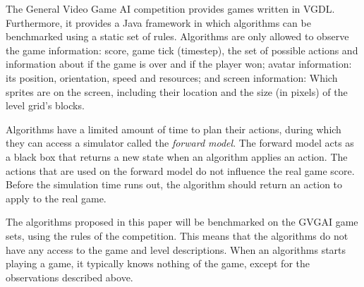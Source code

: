 The General Video Game AI competition provides games written in VGDL.
Furthermore, it provides a Java framework in which algorithms can be
benchmarked using a static set of rules. Algorithms are only allowed to observe
the game information: score, game tick (timestep), the set of possible actions
and information about if the game is over and if the player won; avatar
information: its position, orientation, speed and resources; and screen
information: Which sprites are on the screen, including their location and the
size (in pixels) of the level grid's blocks.

Algorithms have a limited amount of time to plan their actions, during which
they can access a simulator called the \emph{forward model}. The forward model
acts as a black box that returns a new state when an algorithm applies an
action. The actions that are used on the forward model do not influence the real
game score. Before the simulation time runs out, the algorithm should return an
action to apply to the real game.

The algorithms proposed in this paper will be benchmarked on the GVGAI game
sets, using the rules of the competition. This means that the algorithms do not
have any access to the game and level descriptions. When an algorithms starts
playing a game, it typically knows nothing of the game, except for the
observations described above.
